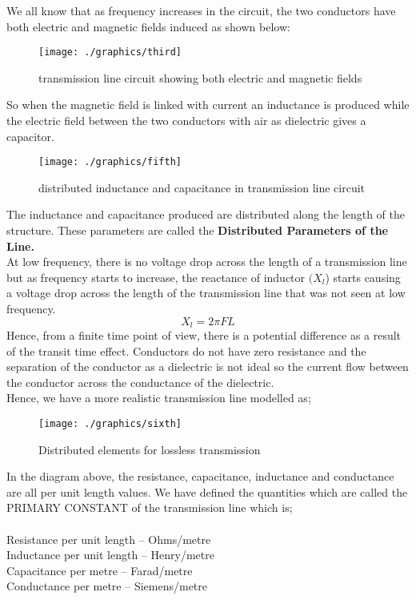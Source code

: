 We all know that as frequency increases in the circuit, the two conductors have both electric and magnetic fields induced as shown below: 

\begin{figure}[h]
\centering
\texttt{[image: ./graphics/third]}
\caption{transmission line circuit showing both electric and magnetic fields}
\end{figure}

So when the magnetic field is linked with current an inductance is produced while the electric field between the two conductors with air as dielectric gives a capacitor.

\begin{figure}[h]
\centering
\texttt{[image: ./graphics/fifth]}
\caption{distributed inductance and capacitance in transmission line circuit}
\end{figure}
The inductance and capacitance produced are distributed along the length of the structure. These parameters are called the \textbf{Distributed Parameters of the Line.} \\
At low frequency, there is no voltage drop across the length of a transmission line but as frequency starts to increase, the reactance of inductor $ (X_{l} $) starts causing a voltage drop across the length of the transmission line that was not seen at low frequency.
\[ 	X_{l} = 2 \pi FL \]
Hence, from a finite time point of view, there is a potential difference as a result of the transit time effect. Conductors do not have zero resistance and the separation of the conductor as a dielectric is not ideal so the current flow between the conductor across the conductance of the dielectric.\\

Hence, we have a more realistic transmission line modelled as;\\
\begin{figure}[h]
\centering
\texttt{[image: ./graphics/sixth]}
\caption{Distributed elements for lossless transmission}
\end{figure}
In the diagram above, the resistance, capacitance, inductance and conductance are all per unit length values. We have defined the quantities which are called the PRIMARY CONSTANT of the transmission line which is;\\\\
Resistance per unit length – Ohms/metre\\
Inductance per unit length – Henry/metre\\
Capacitance per metre – Farad/metre\\
Conductance per metre – Siemens/metre\\


